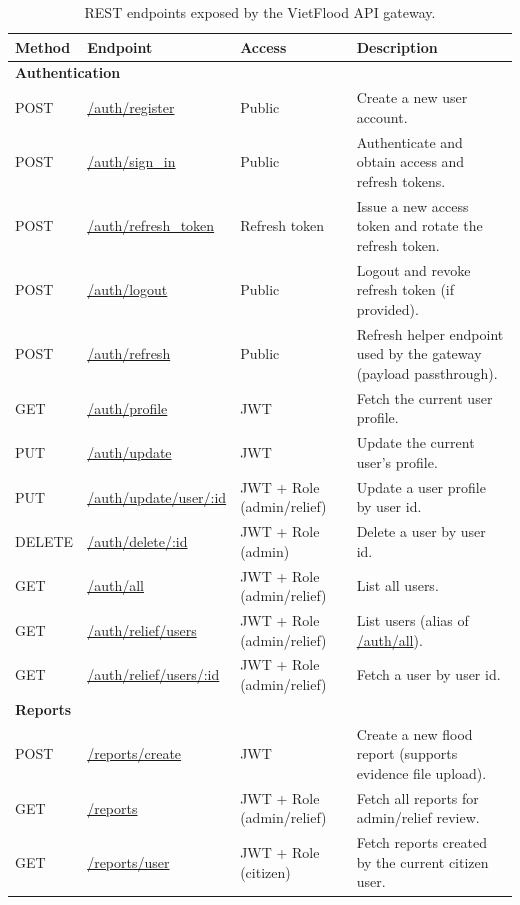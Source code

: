 \begin{table}[H]
\centering
\caption{REST endpoints exposed by the VietFlood API gateway.}
\label{tab:appendix-api-endpoints}
\scriptsize
\setlength{\tabcolsep}{3pt}
\renewcommand{\arraystretch}{1.1}
\begin{tabularx}{\textwidth}{|l|p{4.6cm}|p{3.1cm}|X|}
\hline
\textbf{Method} & \textbf{Endpoint} & \textbf{Access} & \textbf{Description} \\
\hline
\multicolumn{4}{|l|}{\textbf{Authentication}} \\
\hline
POST & \url{/auth/register} & Public & Create a new user account. \\
\hline
POST & \url{/auth/sign_in} & Public & Authenticate and obtain access and refresh tokens. \\
\hline
POST & \url{/auth/refresh_token} & Refresh token & Issue a new access token and rotate the refresh token. \\
\hline
POST & \url{/auth/logout} & Public & Logout and revoke refresh token (if provided). \\
\hline
POST & \url{/auth/refresh} & Public & Refresh helper endpoint used by the gateway (payload passthrough). \\
\hline
GET & \url{/auth/profile} & JWT & Fetch the current user profile. \\
\hline
PUT & \url{/auth/update} & JWT & Update the current user's profile. \\
\hline
PUT & \url{/auth/update/user/:id} & JWT + Role (admin/relief) & Update a user profile by user id. \\
\hline
DELETE & \url{/auth/delete/:id} & JWT + Role (admin) & Delete a user by user id. \\
\hline
GET & \url{/auth/all} & JWT + Role (admin/relief) & List all users. \\
\hline
GET & \url{/auth/relief/users} & JWT + Role (admin/relief) & List users (alias of \url{/auth/all}). \\
\hline
GET & \url{/auth/relief/users/:id} & JWT + Role (admin/relief) & Fetch a user by user id. \\
\hline
\multicolumn{4}{|l|}{\textbf{Reports}} \\
\hline
POST & \url{/reports/create} & JWT & Create a new flood report (supports evidence file upload). \\
\hline
GET & \url{/reports} & JWT + Role (admin/relief) & Fetch all reports for admin/relief review. \\
\hline
GET & \url{/reports/user} & JWT + Role (citizen) & Fetch reports created by the current citizen user. \\

\end{tabularx}
\end{table}

